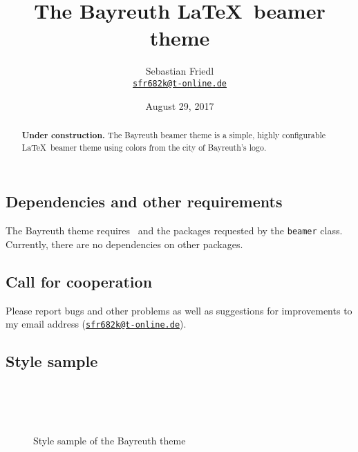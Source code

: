 \documentclass[11pt]{ltxdoc}
\title{The Bayreuth \LaTeX\ beamer theme}
\author{Sebastian Friedl \\ \href{mailto:sfr682k@t-online.de}{\texttt{sfr682k@t-online.de}}}
\date{August 29, 2017}
\begin{document}
	\maketitle
	\thispagestyle{empty}
	
	\medskip
	\begin{abstract}
		\hspace{-1.5em}%
		\textbf{Under construction.}
		The Bayreuth beamer theme is a simple, highly configurable \LaTeX\ beamer theme using colors from the city of Bayreuth's logo.
	\end{abstract}
	

	\tableofcontents

	\clearpage

	
	
	\subsection*{Dependencies and other requirements}
	The Bayreuth theme requires \LaTeXe\ and the packages requested by the \texttt{beamer} class. \\
	Currently, there are no dependencies on other packages.
	

	
	
	\subsection*{Call for cooperation}
	Please report bugs and other problems as well as suggestions for improvements to my email address (\href{mailto:sfr682k@t-online.de}{\texttt{sfr682k@t-online.de}}).
	
	
	\subsection*{Style sample}
	\begin{figure} \centering
		~~~ \\[.5em]
		~~~ \\[.5em]
		~~~ \\[.5em]
		
		\caption{Style sample of the Bayreuth theme}
		\label{stylesample}
	\end{figure}
	
\end{document}
